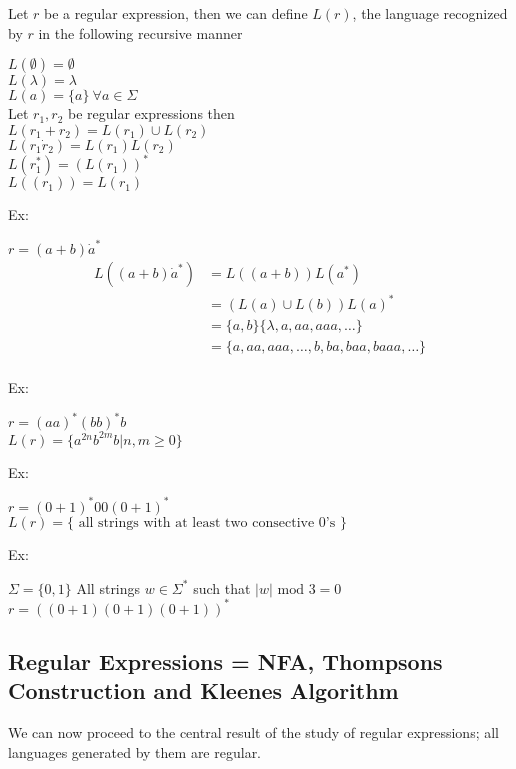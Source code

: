 \documentclass[11pt]{exam}
\begin{document}
Let $r$ be a regular expression, then we can define $L(r)$, the language recognized by $r$ in the following recursive manner


\begin{center}
$L(\emptyset) = \emptyset$\\
$L(\lambda) = \lambda$\\
$L(a) = \{a\} \ \forall a \in \Sigma$\\
Let $r_1, r_2$ be regular expressions then\\
$L(r_1 + r_2) = L(r_1) \cup L(r_2)$\\
$L(r_1 \dot r_2) = L(r_1)L(r_2)$\\
$L(r_1^*) = (L(r_1))^*$\\
$L((r_1)) = L(r_1)$\\
\end{center}

Ex:

\begin{center}
$r = (a + b) \dot a^*$\\
\begin{align*}
L((a + b) \dot a^*) &= L((a+b))L(a^*)\\
&= (L(a) \cup L(b))L(a)^*\\
&= \{a,b\}\{\lambda,a,aa,aaa,\dots\}\\
&= \{a,aa,aaa,\dots,b,ba,baa,baaa,\dots\}\\ 
\end{align*}
\end{center}

Ex:
\begin{center}
$r = (aa)^*(bb)^*b$\\
$L(r) = \{a^{2n}b^{2m}b | n,m \geq 0 \}$
\end{center}

Ex:
\begin{center}
$r = (0+1)^*00(0+1)^*$\\
$L(r) = \{ \text{ all strings with at least two consective 0's } \}$
\end{center}

Ex: 
\begin{center}
$\Sigma = \{0,1\}$
All strings $w \in \Sigma^*$ such that $|w| \text{ mod } 3 = 0$\\

$r = ((0+1)(0+1)(0+1))^*$\\
\end{center}

\subsection{Regular Expressions = NFA, Thompsons Construction and Kleenes Algorithm}
We can now proceed to the central result of the study of regular expressions; all languages generated by them are regular.
\end{document}
